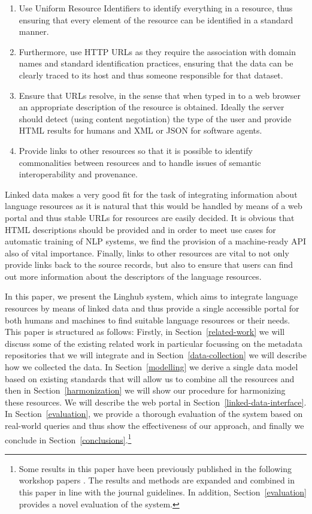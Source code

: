 \documentclass[smallextended]{svjour3}       %
\begin{document}
\begin{enumerate}
    \item Use Uniform Resource Identifiers to identify everything in a resource,
        thus ensuring that every element of the resource can be identified in a
        standard manner.
    \item Furthermore, use HTTP URLs as they require the association with domain
        names and standard identification practices, ensuring that the data can
        be clearly traced to its host and thus someone responsible for that
        dataset.
    \item Ensure that URLs resolve, in the sense that when typed in to a web
        browser an appropriate description of the resource is obtained. Ideally
        the server should detect (using content negotiation) the type of the
        user and provide HTML results for humans and XML or JSON for software
        agents.
    \item Provide links to other resources so that it is possible to identify
        commonalities between resources and to handle issues of semantic
        interoperability and provenance.
\end{enumerate}

Linked data makes a very good fit for the task of integrating information about
language resources as it is natural that this would be handled by means of a web
portal and thus stable URLs for resources are easily decided. It is obvious that
HTML descriptions should be provided and in order to meet use cases for
automatic training of NLP systems, we find the provision of a machine-ready API
also of vital importance. Finally, links to other resources are vital to not
only provide links back to the source records, but also to ensure that users can
find out more information about the descriptors of the language resources.

In this paper, we present the Linghub system, which aims to integrate language
resources by means of linked data and thus provide a single accessible portal
for both humans and machines to find suitable language resources or their needs.
This paper is structured as follows: Firstly, in Section~\ref{related-work} we
will discuss some of the existing related work in particular focussing on the
metadata repositories that we will integrate and in
Section~\ref{data-collection} we will describe how we collected the data. In
Section~\ref{modelling} we derive a single data model based on existing
standards that will allow us to combine all the resources and then in
Section~\ref{harmonization} we will show our procedure for harmonizing these
resources. We will describe the web portal in
Section~\ref{linked-data-interface}. In Section~\ref{evaluation}, we provide a
thorough evaluation of the system based on real-world queries and thus show the
effectiveness of our approach, and finally we conclude in
Section~\ref{conclusions}.\footnote{Some results in this paper have been
    previously published in the following workshop papers \cite{}. The results
    and methods are expanded and combined in this paper in line with the journal
    guidelines. In addition, Section~\ref{evaluation} provides a novel
evaluation of the system.}
\end{document}
